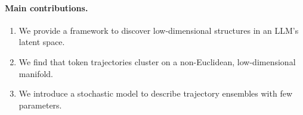\documentclass{article} %
\begin{document}
\paragraph{Main contributions.}
\begin{enumerate}
    \item We provide a framework to discover low-dimensional structures in an LLM's latent space.
    \item We find that token trajectories cluster on a non-Euclidean, low-dimensional manifold.
    \item We introduce a stochastic model to describe trajectory ensembles with few parameters.
\end{enumerate}








\end{document}
